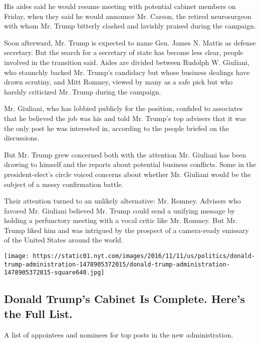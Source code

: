 His aides said he would resume meeting with potential cabinet members on
Friday, when they said he would announce Mr. Carson, the retired
neurosurgeon with whom Mr. Trump bitterly clashed and lavishly praised
during the campaign.

Soon afterward, Mr. Trump is expected to name Gen. James N. Mattis as
defense secretary. But the search for a secretary of state has become
less clear, people involved in the transition said. Aides are divided
between Rudolph W. Giuliani, who staunchly backed Mr. Trump's candidacy
but whose business dealings have drawn scrutiny, and Mitt Romney, viewed
by many as a safe pick but who harshly criticized Mr. Trump during the
campaign.

Mr. Giuliani, who has lobbied publicly for the position, confided to
associates that he believed the job was his and told Mr. Trump's top
advisers that it was the only post he was interested in, according to
the people briefed on the discussions.

But Mr. Trump grew concerned both with the attention Mr. Giuliani has
been drawing to himself and the reports about potential business
conflicts. Some in the president-elect's circle voiced concerns about
whether Mr. Giuliani would be the subject of a messy confirmation
battle.

Their attention turned to an unlikely alternative: Mr. Romney. Advisers
who favored Mr. Giuliani believed Mr. Trump could send a unifying
message by holding a perfunctory meeting with a vocal critic like Mr.
Romney. But Mr. Trump liked him and was intrigued by the prospect of a
camera-ready emissary of the United States around the world.

\href{https://www.nytimes.com/interactive/2016/us/politics/donald-trump-administration.html}{}

\texttt{[image: https://static01.nyt.com/images/2016/11/11/us/politics/donald-trump-administration-1478905372015/donald-trump-administration-1478905372015-square640.jpg]}

\hypertarget{donald-trumps-cabinet-is-complete-heres-the-full-list}{%
\subsection{Donald Trump's Cabinet Is Complete. Here's the Full
List.}\label{donald-trumps-cabinet-is-complete-heres-the-full-list}}

A list of appointees and nominees for top posts in the new
administration.

